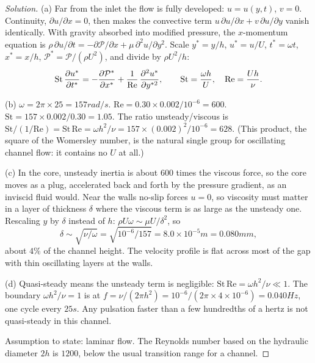 \begin{proof}[Solution]
(a) Far from the inlet the flow is fully developed: $u = u(y, t)$, $v = 0$. Continuity, $\partial u/\partial x = 0$, then makes the convective term $u\,\partial u/\partial x + v\,\partial u/\partial y$ vanish identically. With gravity absorbed into modified pressure, the $x$-momentum equation is $\rho\,\partial u/\partial t = -\partial\mathcal{P}/\partial x + \mu\,\partial^2 u/\partial y^2$. Scale $y^* = y/h$, $u^* = u/U$, $t^* = \omega t$, $x^* = x/h$, $\mathcal{P}^* = \mathcal{P}/(\rho U^2)$, and divide by $\rho U^2/h$:
\[
\mathrm{St}\,\frac{\partial u^*}{\partial t^*} = -\frac{\partial \mathcal{P}^*}{\partial x^*} + \frac{1}{\mathrm{Re}}\,\frac{\partial ^2u^*}{\partial y^{*2}}, \qquad \mathrm{St} = \frac{\omega h}{U}, \quad \mathrm{Re} = \frac{Uh}{\nu}.
\]

(b) $\omega = 2\pi \times 25 = 157\unit{rad/s}$. $\mathrm{Re} = 0.30 \times 0.002/10^{-6} = 600$. $\mathrm{St} = 157 \times 0.002/0.30 = 1.05$. The ratio unsteady/viscous is $\mathrm{St}/(1/\mathrm{Re}) = \mathrm{St}\,\mathrm{Re} = \omega h^2/\nu = 157 \times (0.002)^2/10^{-6} = 628$. (This product, the square of the Womersley number, is the natural single group for oscillating channel flow: it contains no $U$ at all.)

(c) In the core, unsteady inertia is about $600$ times the viscous force, so the core moves as a plug, accelerated back and forth by the pressure gradient, as an inviscid fluid would. Near the walls no-slip forces $u = 0$, so viscosity must matter in a layer of thickness $\delta$ where the viscous term is as large as the unsteady one. Rescaling $y$ by $\delta$ instead of $h$: $\rho U\omega \sim \mu U/\delta^2$, so
\[
\delta \sim \sqrt{\nu/\omega} = \sqrt{10^{-6}/157} = 8.0\times10^{-5}\unit{m} = 0.080\unit{mm},
\]
about $4\%$ of the channel height. The velocity profile is flat across most of the gap with thin oscillating layers at the walls.

(d) Quasi-steady means the unsteady term is negligible: $\mathrm{St}\,\mathrm{Re} = \omega h^2/\nu \ll 1$. The boundary $\omega h^2/\nu = 1$ is at $f = \nu/(2\pi h^2) = 10^{-6}/(2\pi \times 4\times10^{-6}) = 0.040\unit{Hz}$, one cycle every $25\unit{s}$. Any pulsation faster than a few hundredths of a hertz is not quasi-steady in this channel.

Assumption to state: laminar flow. The Reynolds number based on the hydraulic diameter $2h$ is $1200$, below the usual transition range for a channel.
\end{proof}

